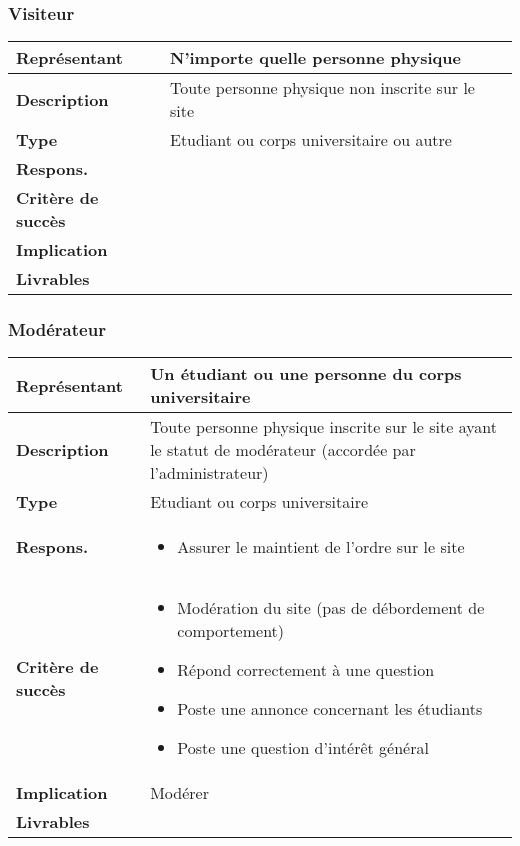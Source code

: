 \subsubsection{Visiteur}

\begin{center}

\begin{tabular}{| >{\bfseries} M{85pt} | M{250pt} |}
	\hline
	Représentant & N'importe quelle personne physique \tabularnewline
	\hline
	Description & Toute personne physique non inscrite sur le site \tabularnewline
	\hline
	Type & Etudiant ou corps universitaire ou autre \tabularnewline
	\hline
	Respons. &
	 \tabularnewline
	\hline
	Critère de succès &
	\tabularnewline
	\hline
	Implication & 
	\tabularnewline
	\hline
	Livrables &  
	\tabularnewline
	\hline
\end{tabular}

\end{center}

\subsubsection{Modérateur}

\begin{center}
\begin{tabular}{| >{\bfseries} M{85pt} | M{250pt} |}
	\hline
	Représentant & Un étudiant ou une personne du corps universitaire \tabularnewline
	\hline
	Description & Toute personne physique inscrite sur le site ayant le statut de modérateur (accordée par l'administrateur) \tabularnewline
	\hline
	Type & Etudiant ou corps universitaire \tabularnewline
	\hline
	Respons. &
	\begin{itemize}
		\item Assurer le maintient de l'ordre sur le site
	\end{itemize} \tabularnewline
	\hline
	Critère de succès &
	\begin{itemize}
	    \item Modération du site (pas de débordement de comportement)
		\item Répond correctement à une question
		\item Poste une annonce concernant les étudiants
		\item Poste une question d'intérêt général
	\end{itemize} \tabularnewline
	\hline
	Implication & Modérer \tabularnewline
	\hline
	Livrables &  
	\tabularnewline
	\hline
\end{tabular}

\end{center}

